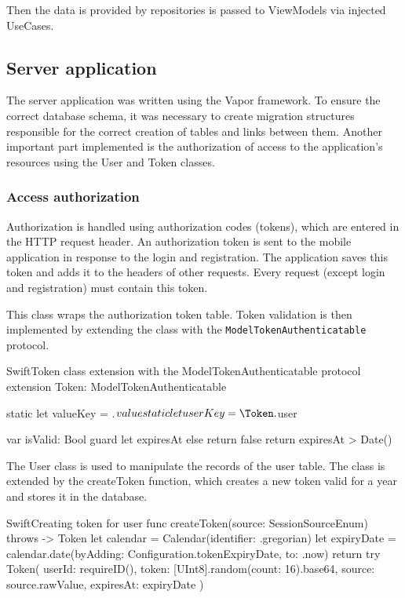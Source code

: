 \documentclass[
  biblatex = false,
  language=english,
  figures=false,
  sourcecodes,
  glossaries,
  index
]{kidiplom}
\begin{document}
Then the data is provided by repositories is passed to ViewModels via injected UseCases.

\subsection{Server application}
The server application was written using the Vapor framework. To ensure the correct database schema, it was necessary to create migration structures responsible for the correct creation of tables and links between them. Another important part implemented is the authorization of access to the application's resources using the User and Token classes.

\subsubsection{Access authorization}
Authorization is handled using authorization codes (tokens), which are entered in the HTTP request header. An authorization token is sent to the mobile application in response to the login and registration. The application saves this token and adds it to the headers of other requests. Every request (except login and registration) must contain this token.

This class wraps the authorization token table. Token validation is then implemented by extending the class with the \texttt{ModelTokenAuthenticatable} protocol.

\begin{kicode}{Swift}{}{Token class extension with the ModelTokenAuthenticatable protocol}
extension Token: ModelTokenAuthenticatable {
  static let valueKey = \Token.$value
  static let userKey = \Token.$user
  
  var isValid: Bool {
    guard let expiresAt else {
      return false
    }
    return expiresAt > Date()
  }
}
\end{kicode}

The User class is used to manipulate the records of the user table. The class is extended by the createToken function, which creates a new token valid for a year and stores it in the database.

\begin{kicode}{Swift}{}{Creating token for user}
func createToken(source: SessionSourceEnum) throws -> Token {
        let calendar = Calendar(identifier: .gregorian)
        let expiryDate = calendar.date(byAdding: Configuration.tokenExpiryDate, to: .now)
        return try Token(
            userId: requireID(),
            token: [UInt8].random(count: 16).base64,
            source: source.rawValue,
            expiresAt: expiryDate
        )
}
\end{kicode}
\end{document}
